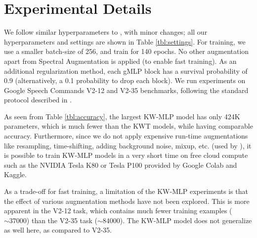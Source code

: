 \documentclass{article} \usepackage{iclr2022_conference,times}
\begin{document}
\section{Experimental Details}
We follow similar hyperparameters to \citet{rybakov2020streaming,berg21_interspeech}, with minor changes; all our hyperparameters and settings are shown in Table \ref{tbl:settings}. For training, we use a smaller batch-size of 256, and train for 140 epochs. No other augmentation apart from Spectral Augmentation \citep{park2019specaugment} is applied (to enable fast training). As an additional regularization method, each gMLP block has a survival probability of 0.9 (alternatively, a 0.1 probability to drop each block). We run experiments on Google Speech Commands V2-12 and V2-35 benchmarks, following the standard protocol described in \citet{warden2018speech}.

As seen from Table \ref{tbl:accuracy}, the largest KW-MLP model has only 424K parameters, which is much fewer than the KWT models, while having comparable accuracy. Furthermore, since we do not apply expensive run-time augmentations like resampling, time-shifting, adding background noise, mixup, etc. (used by \citep{rybakov2020streaming,berg21_interspeech,gong2021ast}), it is possible to train KW-MLP models in a very short time on free cloud compute such as the NVIDIA Tesla K80 or Tesla P100 provided by Google Colab and Kaggle. 

As a trade-off for fast training, a limitation of the KW-MLP experiments is that the effect of various augmentation methods have not been explored. This is more apparent in the V2-12 task, which contains much fewer training examples ($\sim37000$) than the V2-35 task ($\sim84000$). The KW-MLP model does not generalize as well here, as compared to V2-35.
\end{document}
